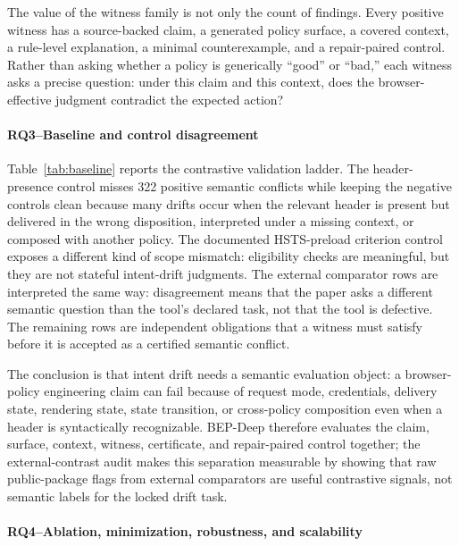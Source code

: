 \documentclass[10pt,conference]{IEEEtran}
\begin{document}


The value of the witness family is not only the count of findings. Every positive witness has a source-backed claim, a generated policy surface, a covered context, a rule-level explanation, a minimal counterexample, and a repair-paired control. Rather than asking whether a policy is generically ``good'' or ``bad,'' each witness asks a precise question: under this claim and this context, does the browser-effective judgment contradict the expected action?

\paragraph{RQ3--Baseline and control disagreement}

Table~\ref{tab:baseline} reports the contrastive validation ladder. The header-presence control misses 322 positive semantic conflicts while keeping the negative controls clean because many drifts occur when the relevant header is present but delivered in the wrong disposition, interpreted under a missing context, or composed with another policy. The documented HSTS-preload criterion control exposes a different kind of scope mismatch: eligibility checks are meaningful, but they are not stateful intent-drift judgments. The external comparator rows are interpreted the same way: disagreement means that the paper asks a different semantic question than the tool's declared task, not that the tool is defective. The remaining rows are independent obligations that a witness must satisfy before it is accepted as a certified semantic conflict.



The conclusion is that intent drift needs a semantic evaluation object: a browser-policy engineering claim can fail because of request mode, credentials, delivery state, rendering state, state transition, or cross-policy composition even when a header is syntactically recognizable. BEP-Deep therefore evaluates the claim, surface, context, witness, certificate, and repair-paired control together; the external-contrast audit makes this separation measurable by showing that raw public-package flags from external comparators are useful contrastive signals, not semantic labels for the locked drift task.

\paragraph{RQ4--Ablation, minimization, robustness, and scalability}
\end{document}

